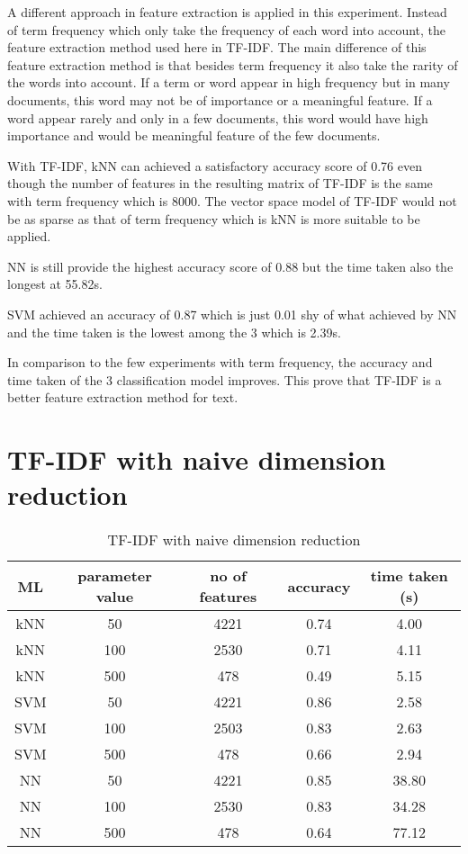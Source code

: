 A different approach in feature extraction is applied in this experiment. Instead of term frequency which only take the frequency of each word into account, the feature extraction method used here in TF-IDF. The main difference of this feature extraction method is that besides term frequency it also take the rarity of the words into account. If a term or word appear in high frequency but in many documents, this word may not be of importance or a meaningful feature. If a word appear rarely and only in a few documents, this word would have high importance and would be meaningful feature of the few documents.

With TF-IDF, kNN can achieved a satisfactory accuracy score of 0.76 even though the number of features in the resulting matrix of TF-IDF is the same with term frequency which is 8000. The vector space model of TF-IDF would not be as sparse as that of term frequency which is kNN is more suitable to be applied.

NN is still provide the highest accuracy score of 0.88 but the time taken also the longest at 55.82s.

SVM achieved an accuracy of 0.87 which is just 0.01 shy of what achieved by NN and the time taken is the lowest among the 3 which is 2.39s.

In comparison to the few experiments with term frequency, the accuracy and time taken of the 3 classification model improves. This prove that TF-IDF is a better feature extraction method for text.


\section{TF-IDF with naive dimension reduction}

\begin{table} [ht]
	\centering
	\begin{tabular}{|| c | c | c | c | c||}
		\hline
		ML & parameter value & no of features & accuracy & time taken (s) \\ [0.5ex]
		\hline\hline
		kNN & 50 & 4221 & 0.74 & 4.00 \\ 
		\hline
		kNN & 100 & 2530 & 0.71 & 4.11 \\ 
		\hline
		kNN & 500 & 478 & 0.49 & 5.15 \\ 
		\hline\hline
		SVM & 50 & 4221 & 0.86 & 2.58 \\
		\hline
		SVM & 100 & 2503 & 0.83 & 2.63 \\
		\hline
		SVM & 500 & 478 & 0.66 & 2.94 \\
		\hline\hline
		NN & 50 & 4221 & 0.85 & 38.80 \\
		\hline
		NN & 100 & 2530 & 0.83 & 34.28 \\
		\hline
		NN & 500 & 478 & 0.64 & 77.12 \\
		\hline\hline
	\end{tabular}
\caption{TF-IDF with naive dimension reduction}
\label{tbl:tfidfNaive}
\end{table}


